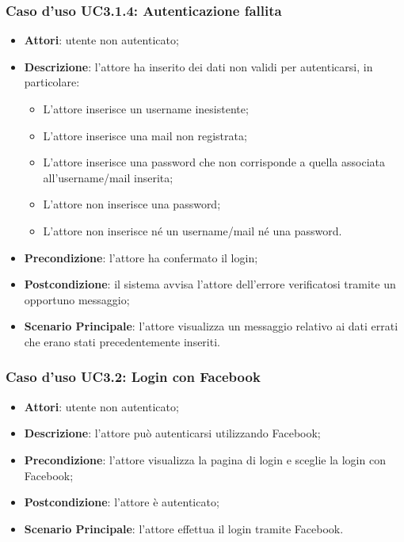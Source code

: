 \subsubsection{Caso d'uso UC3.1.4: Autenticazione fallita}
\begin{itemize}
	\item \textbf{Attori}: utente non autenticato;
	\item \textbf{Descrizione}: l'attore ha inserito dei dati non validi per autenticarsi, in particolare:
		\begin{itemize}
		\item L'attore inserisce un username inesistente;
		\item L'attore inserisce una mail non registrata;
		\item L'attore inserisce una password che non corrisponde a quella associata all'username/mail inserita;
		\item L'attore non inserisce una password;
		\item L'attore non inserisce né un username/mail né una password.
		\end{itemize}
	\item \textbf{Precondizione}: l'attore ha confermato il login;
	\item \textbf{Postcondizione}: il sistema avvisa l'attore dell'errore verificatosi tramite un opportuno messaggio;
	\item \textbf{Scenario Principale}: l'attore visualizza un messaggio relativo ai dati errati che erano stati precedentemente inseriti.	
\end{itemize}

\subsubsection{Caso d'uso UC3.2: Login con Facebook}
\begin{itemize}
	\item \textbf{Attori}: utente non autenticato;
	\item \textbf{Descrizione}: l'attore può autenticarsi utilizzando Facebook;
	\item \textbf{Precondizione}: l'attore visualizza la pagina di login e sceglie la login con Facebook;
	\item \textbf{Postcondizione}: l'attore è autenticato;
	\item \textbf{Scenario Principale}: l'attore effettua il login tramite Facebook.
\end{itemize}
